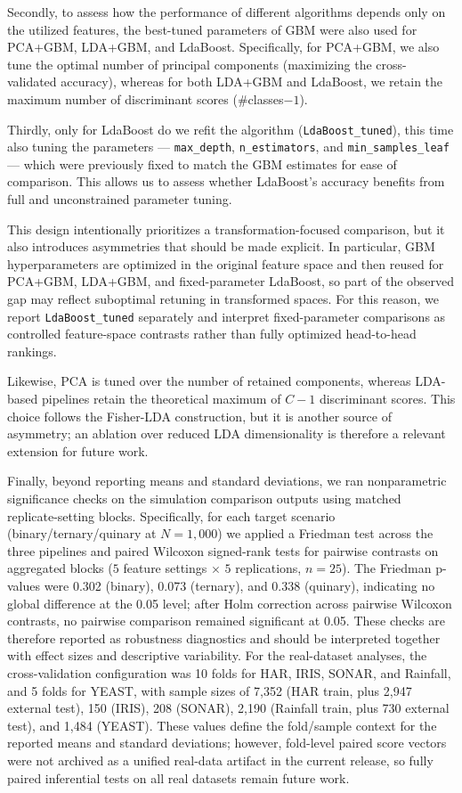 \documentclass[11pt,a4paper]{article}
\begin{document}
Secondly, to assess how the performance of different algorithms depends only on the utilized features, the best-tuned parameters of GBM were also used for PCA+GBM, LDA+GBM, and LdaBoost. Specifically, for PCA+GBM, we also tune the optimal number of principal components (maximizing the cross-validated accuracy), whereas for both LDA+GBM and LdaBoost, we retain the maximum number of discriminant scores (\#classes$-1$).

Thirdly, only for LdaBoost do we refit the algorithm (\texttt{LdaBoost\_tuned}), this time also tuning the parameters — \texttt{max\_depth}, \texttt{n\_estimators}, and \texttt{min\_samples\_leaf} — which were previously fixed to match the GBM estimates for ease of comparison. This allows us to assess whether LdaBoost's accuracy benefits from full and unconstrained parameter tuning.

This design intentionally prioritizes a transformation-focused comparison, but it also introduces asymmetries that should be made explicit. In particular, GBM hyperparameters are optimized in the original feature space and then reused for PCA+GBM, LDA+GBM, and fixed-parameter LdaBoost, so part of the observed gap may reflect suboptimal retuning in transformed spaces. For this reason, we report \texttt{LdaBoost\_tuned} separately and interpret fixed-parameter comparisons as controlled feature-space contrasts rather than fully optimized head-to-head rankings.

Likewise, PCA is tuned over the number of retained components, whereas LDA-based pipelines retain the theoretical maximum of $C-1$ discriminant scores. This choice follows the Fisher-LDA construction, but it is another source of asymmetry; an ablation over reduced LDA dimensionality is therefore a relevant extension for future work.

Finally, beyond reporting means and standard deviations, we ran nonparametric significance checks on the simulation comparison outputs using matched replicate-setting blocks. Specifically, for each target scenario (binary/ternary/quinary at $N=1{,}000$) we applied a Friedman test across the three pipelines and paired Wilcoxon signed-rank tests for pairwise contrasts on aggregated blocks ($5$ feature settings $\times$ $5$ replications, $n=25$). The Friedman p-values were 0.302 (binary), 0.073 (ternary), and 0.338 (quinary), indicating no global difference at the 0.05 level; after Holm correction across pairwise Wilcoxon contrasts, no pairwise comparison remained significant at 0.05. These checks are therefore reported as robustness diagnostics and should be interpreted together with effect sizes and descriptive variability.
For the real-dataset analyses, the cross-validation configuration was 10 folds for HAR, IRIS, SONAR, and Rainfall, and 5 folds for YEAST, with sample sizes of 7,352 (HAR train, plus 2,947 external test), 150 (IRIS), 208 (SONAR), 2,190 (Rainfall train, plus 730 external test), and 1,484 (YEAST). These values define the fold/sample context for the reported means and standard deviations; however, fold-level paired score vectors were not archived as a unified real-data artifact in the current release, so fully paired inferential tests on all real datasets remain future work.
\end{document}
